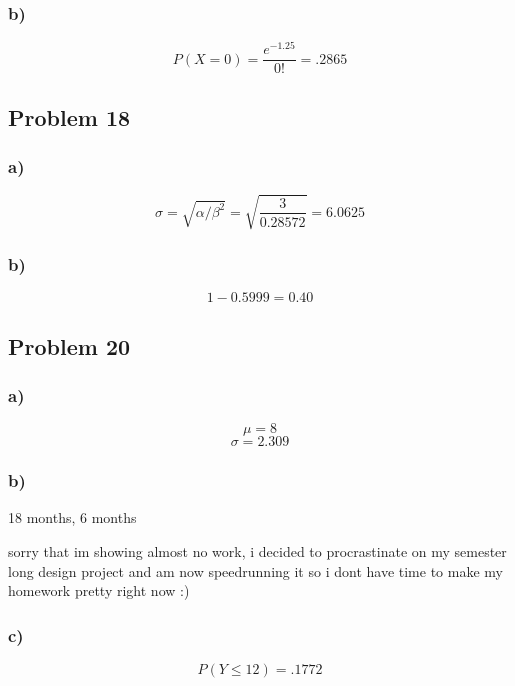 \documentclass{article}
\begin{document}
\subsubsection*{b)}
\begin{equation}
    P(X = 0) = \frac{e^{-1.25}}{0!} = .2865
\end{equation}
\subsection*{Problem 18}
\subsubsection*{a)}
\begin{equation}
    \sigma = \sqrt{\alpha/\beta^2}  = \sqrt{\frac{3}{0.28572}} = 6.0625
\end{equation}
\subsubsection*{b)}
\begin{equation}
    1 -0.5999 = 0.40
\end{equation}
\subsection*{Problem 20}
\subsubsection*{a)}
\begin{equation}
    \mu = 8 
\end{equation}
\begin{equation}
    \sigma = 2.309
\end{equation}
\subsubsection*{b)}
\begin{center}
    18 months, 6 months
    
    sorry that im showing almost no work, i decided to procrastinate on my semester long design project and am now speedrunning it so i dont have time to make my homework pretty right now :)
\end{center}
\subsubsection*{c)}
\begin{equation}
    P( Y \leq 12) = .1772
\end{equation}
\end{document}
